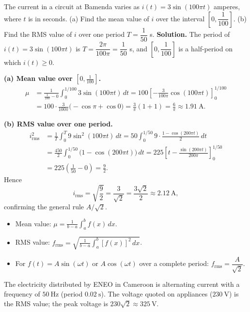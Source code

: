 \documentclass[11pt]{article}
\begin{document}
\begin{exoresolu}
The current in a circuit at Bamenda varies as $i(t)=3\sin(100\pi t)$ amperes, where $t$ is in seconds. 
(a) Find the mean value of $i$ over the interval $\left[0,\dfrac{1}{100}\right]$. 
(b) Find the RMS value of $i$ over one period $T=\dfrac{1}{50}$ s.
\tcblower
\textbf{Solution.} The period of $i(t)=3\sin(100\pi t)$ is $T=\dfrac{2\pi}{100\pi}=\dfrac{1}{50}$ s, and $\left[0,\dfrac{1}{100}\right]$ is a half-period on which $i(t)\geq 0$.

\textbf{(a) Mean value over $\left[0,\frac{1}{100}\right]$.}
\begin{align*}
\mu &= \frac{1}{\frac{1}{100}-0}\int_0^{1/100} 3\sin(100\pi t)\,dt
=100\left[-\frac{3}{100\pi}\cos(100\pi t)\right]_0^{1/100}\\
&=100\cdot\frac{3}{100\pi}\bigl(-\cos\pi+\cos 0\bigr)
=\frac{3}{\pi}(1+1)=\frac{6}{\pi}\approx 1.91\ \mathrm{A}.
\end{align*}

\textbf{(b) RMS value over one period.}
\begin{align*}
i_{\mathrm{rms}}^2 &= \frac{1}{T}\int_0^{T} 9\sin^2(100\pi t)\,dt
=50\int_0^{1/50} 9\cdot\frac{1-\cos(200\pi t)}{2}\,dt\\
&=\frac{450}{2}\int_0^{1/50}\bigl(1-\cos(200\pi t)\bigr)\,dt
=225\left[t-\frac{\sin(200\pi t)}{200\pi}\right]_0^{1/50}\\
&=225\left(\frac{1}{50}-0\right)=\frac{9}{2}.
\end{align*}
Hence
\[
i_{\mathrm{rms}}=\sqrt{\frac{9}{2}}=\frac{3}{\sqrt{2}}=\frac{3\sqrt{2}}{2}\approx 2.12\ \mathrm{A},
\]
confirming the general rule $A/\sqrt{2}$.
\end{exoresolu}

\begin{aretenir}
\begin{itemize}
\item Mean value: $\displaystyle \mu = \frac{1}{b-a}\int_a^b f(x)\,dx$.
\item RMS value: $\displaystyle f_{\mathrm{rms}} = \sqrt{\frac{1}{b-a}\int_a^b [f(x)]^2\,dx}$.
\item For $f(t)=A\sin(\omega t)$ or $A\cos(\omega t)$ over a complete period: $f_{\mathrm{rms}} = \dfrac{A}{\sqrt{2}}$.
\end{itemize}
\end{aretenir}

\begin{savaistu}
The electricity distributed by ENEO in Cameroon is alternating current with a frequency of $50\ \mathrm{Hz}$ (period $0.02\ \mathrm{s}$). The voltage quoted on appliances ($230\ \mathrm{V}$) is the RMS value; the peak voltage is $230\sqrt{2}\approx 325\ \mathrm{V}$.
\end{savaistu}
\end{document}
